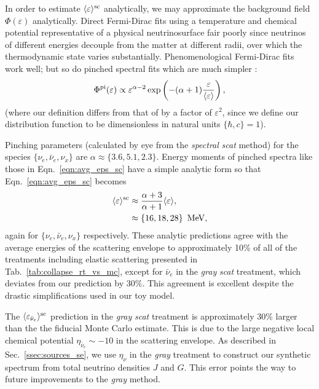 \documentclass[aps,floatfix,prd,superscriptaddress,twocolumn]{revtex4-1}
\begin{document}
In order to estimate $\langle \varepsilon \rangle^{\rm sc}$ analytically, we may
approximate the background field $\Phi(\varepsilon)$ analytically.
Direct Fermi-Dirac fits using a temperature and chemical potential
representative of a physical neutrinosurface fair poorly since neutrinos of
different energies decouple from the matter at different radii, over which
the thermodynamic state varies substantially.
Phenomenological Fermi-Dirac fits work well;
but so do pinched spectral fits which are much simpler \cite{miri????}:
\begin{equation}
  \label{eqn:pinched_spectra}
  \Phi^{\rm pi}(\varepsilon) \propto
  \varepsilon^{\alpha-2}
  \exp\left(-(\alpha+1)\frac{\varepsilon}{\langle\varepsilon\rangle}\right),
\end{equation}
(where our definition differs from that of \cite{miri????} by a factor of
$\varepsilon^2$, since we define our distribution function to be dimensionless
in natural units $\{\hbar,c\}=1$).

Pinching parameters
(calculated by eye from the \emph{spectral} \emph{scat} method)
for the species
$\{\nu_e,\bar{\nu}_e,\nu_x\}$ are $\alpha\approx\{3.6,5.1,2.3\}$.
Energy moments of pinched spectra like those in Eqn.~\ref{eqn:avg_eps_sc}
have a simple analytic form so that Eqn.~\ref{eqn:avg_eps_sc} becomes
\begin{align}
  \label{eqn:pinched_avg_eps_sc_1}
  \langle\varepsilon\rangle^{\rm sc}
  &\approx \frac{\alpha+3}{\alpha+1} \langle\varepsilon\rangle, \\
  \label{eqn:pinched_avg_eps_sc_3}
  &\approx \{16,18,28\}\,~{\rm MeV},
\end{align}
again for $\{\nu_e,\bar{\nu}_e,\nu_x\}$ respectively.
These analytic predictions agree with the average energies of the scattering
envelope to approximately 10\%
of all of the treatments including elastic scattering presented
in Tab.~\ref{tab:collapse_rt_vs_mc}, except for
$\bar{\nu}_e$ in the \emph{gray} \emph{scat} treatment,
which deviates from our prediction by 30\%.
This agreement is excellent despite the drastic
simplifications used in our toy model.

The $\langle\varepsilon_{\bar{\nu}_e}\rangle^{\rm sc}$ prediction
in the \emph{gray} \emph{scat} treatment is approximately 30\%
larger than the the fiducial Monte Carlo estimate. This is
due to the large negative local chemical potential
$\eta_{\bar{\nu}_e}\sim-10$ in the scattering envelope.
As described in Sec.~\ref{ssec:sources_se},
we use $\eta_\nu$ in the \emph{gray} treatment to construct our
synthetic spectrum from total neutrino densities $J$ and $G$.
This error points the way to future improvements to the \emph{gray} method.
\end{document}
